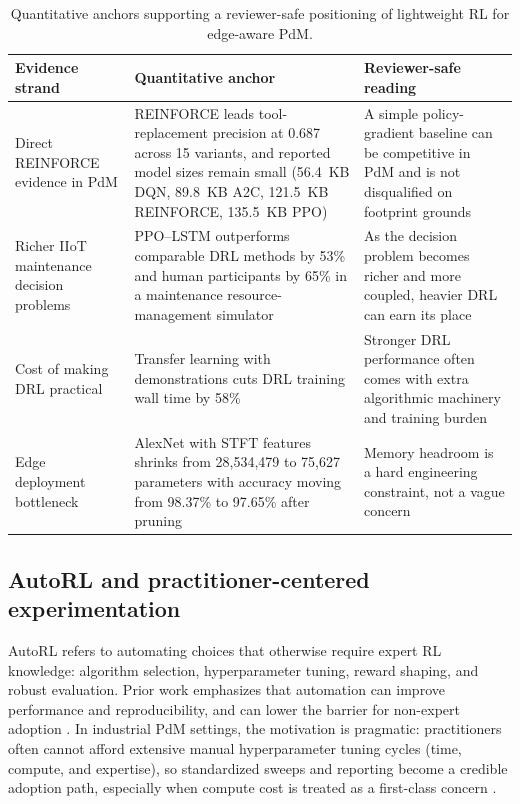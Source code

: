 \documentclass[sn-basic]{sn-jnl} %
\begin{document}
\begin{table}[t]
        \centering
        \small
        \setlength{\tabcolsep}{4pt}
        \begin{tabular}{p{} p{} p{}}
                \toprule
                Evidence strand & Quantitative anchor & Reviewer-safe reading \\
                \midrule
                Direct REINFORCE evidence in PdM & REINFORCE leads tool-replacement precision at 0.687 across 15 variants, and reported model sizes remain small (56.4~KB DQN, 89.8~KB A2C, 121.5~KB REINFORCE, 135.5~KB PPO) \cite{Siraskar2025} & A simple policy-gradient baseline can be competitive in PdM and is not disqualified on footprint grounds \\
                Richer IIoT maintenance decision problems & PPO--LSTM outperforms comparable DRL methods by 53\% and human participants by 65\% in a maintenance resource-management simulator \cite{Ong2022-01} & As the decision problem becomes richer and more coupled, heavier DRL can earn its place \\
                Cost of making DRL practical & Transfer learning with demonstrations cuts DRL training wall time by 58\% \cite{Ong2022-02} & Stronger DRL performance often comes with extra algorithmic machinery and training burden \\
                Edge deployment bottleneck & AlexNet with STFT features shrinks from 28,534,479 to 75,627 parameters with accuracy moving from 98.37\% to 97.65\% after pruning \cite{Pandey2023} & Memory headroom is a hard engineering constraint, not a vague concern \\
                \bottomrule
        \end{tabular}
        \caption{Quantitative anchors supporting a reviewer-safe positioning of lightweight RL for edge-aware PdM.}
        \label{tab:quantitative_anchors_lightweight_edge}
\end{table}

\subsection{AutoRL and practitioner-centered experimentation}
AutoRL refers to automating choices that otherwise require expert RL knowledge: algorithm selection, hyperparameter tuning, reward shaping, and robust evaluation. Prior work emphasizes that automation can improve performance and reproducibility, and can lower the barrier for non-expert adoption \cite{Faust2019, Mussi2022}. In industrial PdM settings, the motivation is pragmatic: practitioners often cannot afford extensive manual hyperparameter tuning cycles (time, compute, and expertise), so standardized sweeps and reporting become a credible adoption path, especially when compute cost is treated as a first-class concern \cite{Schwartz2020, Strubell2019}.
\end{document}

